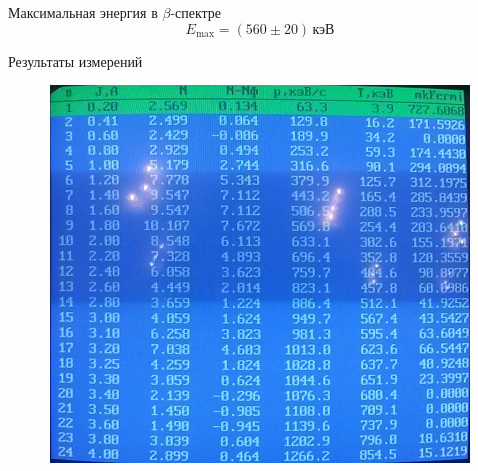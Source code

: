 \documentclass[12pt]{article}
\begin{document}
\par
	Максимальная энергия в $\beta$-спектре
\[
	E_\text{max} = \left(560 \pm 20\right) \, \text{кэВ}
\]
\newpage
\par
	Результаты измерений
\begin{figure}[h!]
	\centering
	\includegraphics[width = 12cm, height = 10cm]{results.png}
\end{figure}
\end{document}

